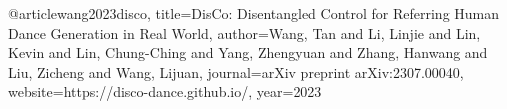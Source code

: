 @article{wang2023disco,
  title={DisCo: Disentangled Control for Referring Human Dance Generation in Real World},
  author={Wang, Tan and Li, Linjie and Lin, Kevin and Lin, Chung-Ching and Yang, Zhengyuan and Zhang, Hanwang and Liu, Zicheng and Wang, Lijuan},
  journal={arXiv preprint arXiv:2307.00040},
  website={https://disco-dance.github.io/},
  year={2023}
}